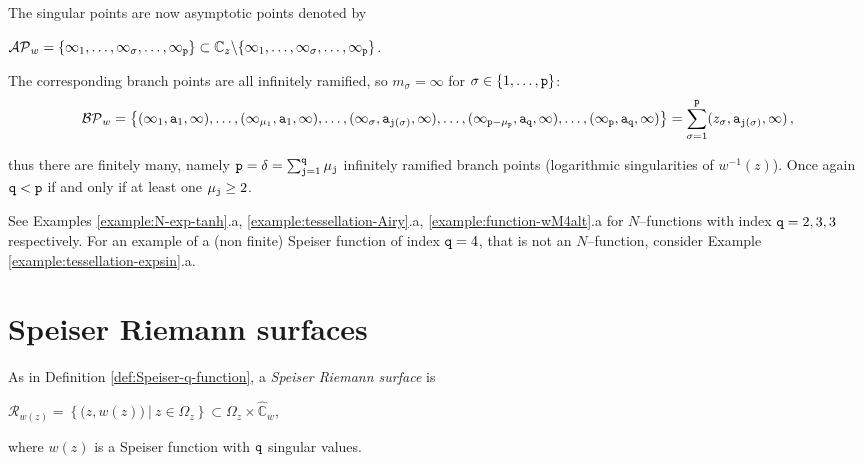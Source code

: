 \documentclass[final,3p,times]{elsarticle}
\newcommand{\CC}{\ensuremath{{\mathbb C}}}
\newcommand{\CW}{\ensuremath{{\widehat{\mathbb C}}}}
\newcommand{\R}{\ensuremath{{\mathcal R}}}
\theoremstyle{definition}
\begin{document}
\noindent
The singular points are now asymptotic points denoted by

\centerline{
$\mathcal{AP}_w = \{ \infty_1,\ldots,\infty_\sigma,\ldots,\infty_{\tt p} \}
\subset \CC_z\backslash \{ \infty_1,\ldots,\infty_\sigma,\ldots,\infty_{\tt p} \}
$.
}

\noindent
The corresponding branch points are all infinitely ramified, so $m_{\sigma}= \infty$ for $\sigma \in \{1,\ldots,{\tt p} \}$:
\begin{equation*}
\mathcal{BP}_w =
\big\{
( \infty_1, {\tt a}_1, \infty ), \ldots, ( \infty_{\mu_1}, {\tt a}_1, \infty ),
\ldots, ( \infty_\sigma, {\tt a}_{ {\tt j}(\sigma)}, \infty ),
\ldots, 
( \infty_{{\tt p}-\mu_{\tt p}}, {\tt a}_{\tt q}, \infty ),\ldots, ( \infty_{\tt p}, {\tt a}_{\tt q}, \infty )
\big\}
=\sum_{\sigma=1}^{\tt p} 
( z_\sigma, {\tt a}_{{\tt j}(\sigma)}, \infty )\, ,
\end{equation*}

\noindent  
thus there are finitely many, namely
${\tt p} = \delta = \sum_{{\tt j}=1}^{\tt q} \mu_{\tt j}$
infinitely ramified branch points (logarithmic singularities of $w^{-1}(z)$).
Once again ${\tt q} < {\tt p}$ if and only if at least one $\mu_{\tt j} \geq 2$.


See Examples \ref{example:N-exp-tanh}.a, \ref{example:tessellation-Airy}.a, 
\ref{example:function-wM4alt}.a for $N$--functions with index ${\tt q}=2, 3, 3$ respectively.
For an example of a (non finite) Speiser function of index ${\tt q}=4$, that is
not an $N$--function,
consider Example \ref{example:tessellation-expsin}.a.
 
\section{Speiser Riemann surfaces}
\label{sec:Speiser-Riemann-surfaces}

As in Definition \ref{def:Speiser-q-function}, a \emph{Speiser Riemann surface} is 

\centerline{$
\R_{w(z)}= 
\left\{
\big(z,w(z) \big) \ \vert \  z \in \Omega_z \right\} 
\subset 
\Omega_z \times\CW_{w}$,}

\noindent
where $w(z)$ is a Speiser function with ${\tt q}$ singular values.
\end{document}
